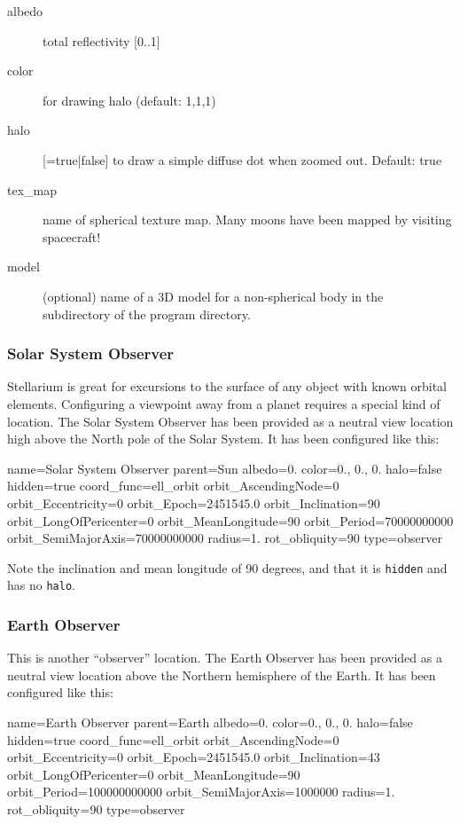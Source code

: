 \begin{description}
  \item[albedo] total reflectivity [0..1]
  \item[color] for drawing halo (default: 1,1,1)
  \item[halo] [=true|false] to draw a simple diffuse dot when zoomed out. Default: true
  \item[tex\_map] name of spherical texture map. Many moons have been mapped by visiting spacecraft!
  \item[model] (optional) name of a 3D model for a non-spherical body in the  subdirectory of the program directory. 
\end{description}



\subsubsection{Solar System Observer}
\label{sec:ssystem.ini:SolarSystemObserver}

Stellarium is great for excursions to the surface of any object with
known orbital elements.  Configuring a viewpoint away from a planet
requires a special kind of location. The Solar System Observer has
been provided as a neutral view location high above the North pole of
the Solar System. It has been configured like this:
\begin{configfile}
name=Solar System Observer
parent=Sun
albedo=0.
color=0., 0., 0.
halo=false
hidden=true
coord_func=ell_orbit
orbit_AscendingNode=0
orbit_Eccentricity=0
orbit_Epoch=2451545.0
orbit_Inclination=90
orbit_LongOfPericenter=0
orbit_MeanLongitude=90
orbit_Period=70000000000
orbit_SemiMajorAxis=70000000000
radius=1.
rot_obliquity=90
type=observer
\end{configfile}
Note the inclination and mean longitude of 90 degrees, and that it is \texttt{hidden} and has no \texttt{halo}. 

\subsubsection{Earth Observer}
\label{sec:ssystem.ini:EarthObserver}

This is another ``observer'' location.  The Earth Observer has
been provided as a neutral view location above the Northern hemisphere of
the Earth. It has been configured like this:
\begin{configfile}
name=Earth Observer
parent=Earth
albedo=0.
color=0., 0., 0.
halo=false
hidden=true
coord_func=ell_orbit
orbit_AscendingNode=0
orbit_Eccentricity=0
orbit_Epoch=2451545.0
orbit_Inclination=43
orbit_LongOfPericenter=0
orbit_MeanLongitude=90
orbit_Period=100000000000
orbit_SemiMajorAxis=1000000
radius=1.
rot_obliquity=90
type=observer
\end{configfile}


